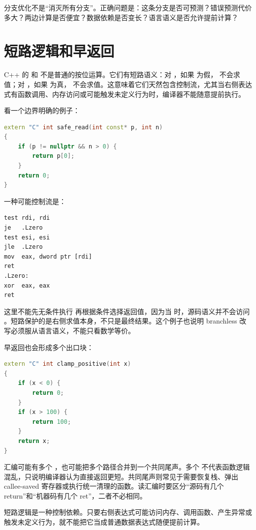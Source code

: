 \begin{keyidea}
分支优化不是“消灭所有分支”。正确问题是：这条分支是否可预测？错误预测代价多大？两边计算是否便宜？数据依赖是否变长？语言语义是否允许提前计算？
\end{keyidea}

\section{短路逻辑和早返回}

C++ 的 \code{&&} 和 \code{||} 不是普通的按位运算。它们有短路语义：对 ，如果  为假， 不会求值；对 ，如果  为真， 不会求值。这意味着它们天然包含控制流，尤其当右侧表达式有函数调用、内存访问或可能触发未定义行为时，编译器不能随意提前执行。

看一个边界明确的例子：

\begin{lstlisting}[language=C++]
extern "C" int safe_read(int const* p, int n)
{
    if (p != nullptr && n > 0) {
        return p[0];
    }
    return 0;
}
\end{lstlisting}

一种可能控制流是：

\begin{lstlisting}
test rdi, rdi
je   .Lzero
test esi, esi
jle  .Lzero
mov  eax, dword ptr [rdi]
ret
.Lzero:
xor  eax, eax
ret
\end{lstlisting}

这里不能先无条件执行  再根据条件选择返回值，因为当  时，源码语义并不会访问 。短路保护的是右侧求值本身，不只是最终结果。这个例子也说明 branchless 改写必须服从语言语义，不能只看数学等价。

早返回也会形成多个出口块：

\begin{lstlisting}[language=C++]
extern "C" int clamp_positive(int x)
{
    if (x < 0) {
        return 0;
    }
    if (x > 100) {
        return 100;
    }
    return x;
}
\end{lstlisting}

汇编可能有多个 ，也可能把多个路径合并到一个共同尾声。多个  不代表函数逻辑混乱，只说明编译器认为直接返回更短。共同尾声则常见于需要恢复栈、弹出 callee-saved 寄存器或执行统一清理的函数。读汇编时要区分“源码有几个 return”和“机器码有几个 ret”，二者不必相同。

\begin{keyidea}
短路逻辑是一种控制依赖。只要右侧表达式可能访问内存、调用函数、产生异常或触发未定义行为，就不能把它当成普通数据表达式随便提前计算。
\end{keyidea}

